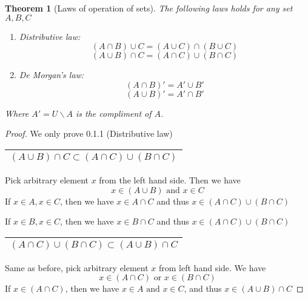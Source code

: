 \documentclass{article}
\theoremstyle{MyNonumberplain}
\theoremstyle{break}
\newtheorem*{proof}{Proof. }
\theoremstyle{break}
\newtheorem{theorem}{Theorem}[section]
\theoremstyle{break}
\theoremstyle{definition}
\theoremstyle{break}
\begin{document}
\begin{thmbox}
    \begin{theorem}[Laws of operation of sets]
        The following laws holds for any set $A,B,C$
        \begin{enumerate}
            \item Distributive law:\\
                    $$(A\cap B)\cup C=(A\cup C)\cap (B\cup C)$$
                    $$(A\cup B)\cap C=(A\cap C)\cup (B\cap C)$$
            \item De Morgan's law:\\
                    $$(A\cap B)'=A' \cup B'$$
                    $$(A\cup B)'=A' \cap B'$$
        \end{enumerate}
        Where $A'= U \backslash A$ is the compliment of $A$.
    \end{theorem}    
    \begin{prfbox}
        \begin{proof}
            We only prove 0.1.1 (Distributive law)
            
            \begin{tabular}{|c|}
              \hline
              $(A \cup B) \cap C \subset (A \cap C) \cup (B \cap C)$\\
              \hline
            \end{tabular}
            
            Pick arbitrary element $x$ from the left hand side. Then we have
            \[ x \in (A \cup B) \text{ and } x \in C \]
            If $x \in A, x \in C$, then we have $x \in A \cap C$ and thus $x \in (A \cap
            C) \cup (B \cap C)$
            
            If $x \in B, x \in C$, then we have $x \in B \cap C$ and thus $x \in (A \cap
            C) \cup (B \cap C)$
            
            \begin{tabular}{|c|}
              \hline
              $(A \cap C) \cup (B \cap C) \subset (A \cup B) \cap C$\\
              \hline
            \end{tabular}
            
            Same as before, pick arbitrary element $x$ from left hand side. We have
            \[ x \in (A \cap C) \text{ or } x \in (B \cap C) \]
            If $x \in (A \cap C)$, then we have $x \in A \text{ and } x \in C$, and thus $x
            \in (A \cup B) \cap C$
            

\end{proof}
\end{prfbox}
\end{thmbox}
\end{document}
